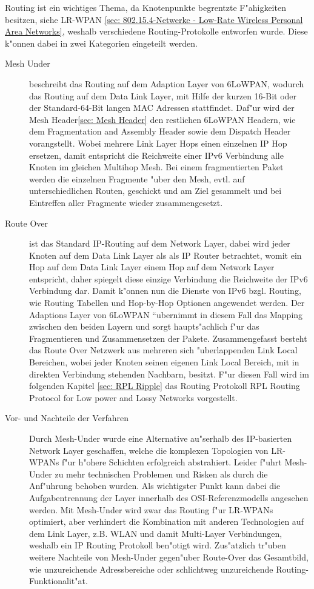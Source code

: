 \documentclass[final]{lktseminar}
\begin{document}
Routing ist ein wichtiges Thema, da Knotenpunkte begrentzte F"ahigkeiten besitzen, siehe LR-WPAN
\ref{sec: 802.15.4-Netwerke - Low-Rate Wireless Personal Area Networks},
weshalb verschiedene Routing-Protokolle entworfen wurde. Diese k"onnen dabei in zwei
Kategorien eingeteilt werden.
\begin{description}
    \item[Mesh Under] beschreibt das Routing auf dem Adaption Layer von 6LoWPAN, wodurch
    das Routing auf dem Data Link Layer, mit Hilfe der kurzen 16-Bit oder der Standard-64-Bit langen MAC Adressen stattfindet.
    Daf"ur wird der Mesh Header\ref{sec: Mesh Header} den restlichen 6LoWPAN Headern,
    wie dem Fragmentation and Assembly Header sowie dem Dispatch Header vorangstellt.
    Wobei mehrere Link Layer Hops einen einzelnen IP Hop ersetzen, damit entspricht die Reichweite einer IPv6 Verbindung
    alle Knoten im gleichen Multihop Mesh. Bei einem fragmentierten Paket werden die einzelnen Fragmente
    "uber den Mesh, evtl. auf unterschiedlichen Routen, geschickt und am Ziel gesammelt und
    bei Eintreffen aller Fragmente wieder zusammengesetzt.

    \item[Route Over] ist das Standard IP-Routing auf dem Network Layer, dabei wird jeder Knoten
    auf dem Data Link Layer als als IP Router betrachtet, womit ein Hop auf dem Data Link Layer einem
    Hop auf dem Network Layer entspricht, daher spiegelt diese einzige Verbindung die Reichweite der IPv6 Verbindung dar.
    Damit k"onnen nun die Dienste von IPv6 bzgl. Routing, wie Routing Tabellen und Hop-by-Hop Optionen
    angewendet werden. Der Adaptions Layer von 6LoWPAN ``ubernimmt in diesem Fall das Mapping zwischen
    den beiden Layern und sorgt haupts"achlich f"ur das Fragmentieren und Zusammensetzen der Pakete.
    Zusammengefasst besteht das Route Over Netzwerk aus mehreren sich "uberlappenden Link Local Bereichen,
    wobei jeder Knoten seinen eigenen Link Local Bereich, mit in direkten Verbindung stehenden Nachbarn, besitzt.
    F"ur diesen Fall wird im folgenden Kapitel \ref{sec: RPL Ripple} das Routing Protokoll
    RPL Routing Protocol for Low power and Lossy Networks vorgestellt.

    \item[Vor- und Nachteile der Verfahren] \cite{routing_draft} Durch Mesh-Under wurde eine Alternative au"serhalb
    des IP-basierten Network Layer geschaffen, welche die komplexen Topologien von LR-WPANs
    f"ur h"ohere Schichten erfolgreich abstrahiert. Leider f"uhrt Mesh-Under zu mehr technischen Problemen
    und Risken als durch die Anf"uhrung behoben wurden. Als wichtigster Punkt kann dabei die Aufgabentrennung
    der Layer innerhalb des OSI-Referenzmodells angesehen werden. Mit Mesh-Under wird zwar das Routing f"ur
    LR-WPANs optimiert, aber verhindert die Kombination mit anderen Technologien auf dem Link Layer, z.B. WLAN und damit
    Multi-Layer Verbindungen, weshalb ein IP Routing Protokoll ben"otigt wird.
    Zus"atzlich tr"uben weitere Nachteile von Mesh-Under gegen"uber Route-Over das Gesamtbild,
    wie unzureichende Adressbereiche oder schlichtweg unzureichende Routing-Funktionalit"at.


\end{description}
\end{document}
